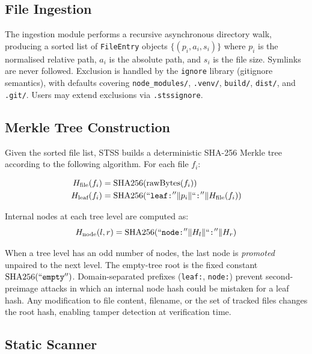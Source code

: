 \documentclass[11pt,twocolumn]{article}
\begin{document}
\subsection{File Ingestion}

The ingestion module performs a recursive asynchronous directory walk,
producing a sorted list of \texttt{FileEntry} objects
$\{(p_i, a_i, s_i)\}$ where $p_i$ is the normalised relative path,
$a_i$ is the absolute path, and $s_i$ is the file size. Symlinks are
never followed. Exclusion is handled by the \texttt{ignore} library
(gitignore semantics), with defaults covering \texttt{node\_modules/},
\texttt{.venv/}, \texttt{build/}, \texttt{dist/}, and \texttt{.git/}.
Users may extend exclusions via \texttt{.stssignore}.

\subsection{Merkle Tree Construction}

Given the sorted file list, STSS builds a deterministic SHA-256 Merkle
tree according to the following algorithm. For each file $f_i$:

\begin{align}
H_{\text{file}}(f_i) &= \text{SHA256}(\text{rawBytes}(f_i)) \\
H_{\text{leaf}}(f_i) &= \text{SHA256}(``\texttt{leaf:}'' \| p_i \| ``\texttt{:}'' \| H_{\text{file}}(f_i))
\end{align}

Internal nodes at each tree level are computed as:
\begin{equation}
H_{\text{node}}(l, r) = \text{SHA256}(``\texttt{node:}'' \| H_l \| ``\texttt{:}'' \| H_r)
\end{equation}

When a tree level has an odd number of nodes, the last node is
\emph{promoted} unpaired to the next level. The empty-tree root is the
fixed constant $\text{SHA256}(``\texttt{empty}'')$. Domain-separated
prefixes (\texttt{leaf:}, \texttt{node:}) prevent second-preimage attacks
in which an internal node hash could be mistaken for a leaf hash.
Any modification to file content, filename, or the set of tracked files
changes the root hash, enabling tamper detection at verification time.

\subsection{Static Scanner}
\end{document}
